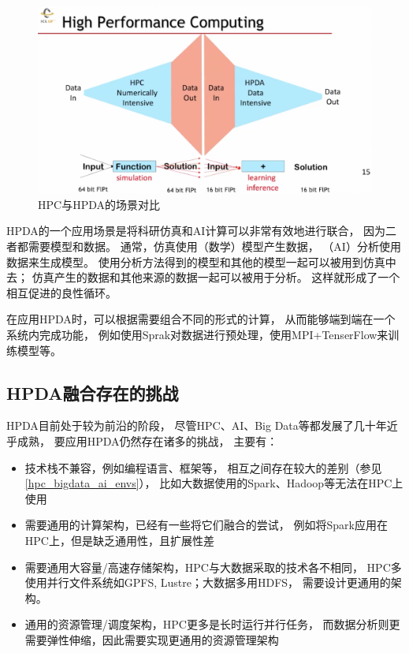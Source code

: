\begin{figure}[ht!]
    \centering
    \includegraphics[width=\linewidth]{images/hpc-vs-ai.png}
    \caption{HPC与HPDA的场景对比\cite{jack_hpc_ai}}
    \label{hpc_vs_hpda}
\end{figure}

HPDA的一个应用场景是将科研仿真和AI计算可以非常有效地进行联合，
因为二者都需要模型和数据。
通常，仿真使用（数学）模型产生数据，
（AI）分析使用数据来生成模型。
使用分析方法得到的模型和其他的模型一起可以被用到仿真中去；
仿真产生的数据和其他来源的数据一起可以被用于分析。
这样就形成了一个相互促进的良性循环\cite{jack_hpc_ai}。

在应用HPDA时，可以根据需要组合不同的形式的计算，
从而能够端到端在一个系统内完成功能，
例如使用Sprak对数据进行预处理，使用MPI+TenserFlow来训练模型等。

\subsection{HPDA融合存在的挑战}

HPDA目前处于较为前沿的阶段，
尽管HPC、AI、Big Data等都发展了几十年近乎成熟，
要应用HPDA仍然存在诸多的挑战，
主要有：

\begin{itemize}
    \item 技术栈不兼容，例如编程语言、框架等，
    相互之间存在较大的差别（参见\cref{hpc_bigdata_ai_envs}），
    比如大数据使用的Spark、Hadoop等无法在HPC上使用\cite{hpda_qa}
    \item 需要通用的计算架构，已经有一些将它们融合的尝试，
    例如将Spark应用在HPC上\cite{spark_on_hpc}，但是缺乏通用性，且扩展性差
    \item 需要通用大容量/高速存储架构，HPC与大数据采取的技术各不相同，
    HPC多使用并行文件系统如GPFS, Lustre；大数据多用HDFS，
    需要设计更通用的架构\cite{two_level_storage,netcdf_bigdata}。
    \item 通用的资源管理/调度架构，HPC更多是长时运行并行任务，
    而数据分析则更需要弹性伸缩，因此需要实现更通用的资源管理架构\cite{ml_map_reduce,hpc_idle_bigdata}
\end{itemize}

